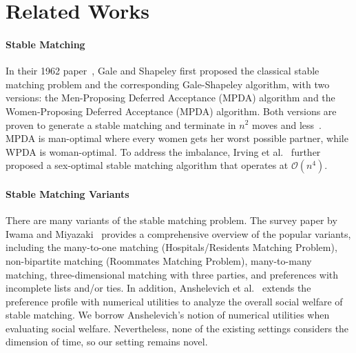 \section{Related Works}
\paragraph{Stable Matching}
In their 1962 paper~\cite{galeshapley1962}, Gale and Shapeley first proposed the classical stable matching problem and the corresponding
Gale-Shapeley algorithm, with two versions: the Men-Proposing Deferred Acceptance (MPDA) algorithm and the Women-Proposing Deferred Acceptance (MPDA) algorithm. Both versions are proven to generate a stable matching and terminate in $n^2$ moves and less~\cite{irving1989textbook}. MPDA is man-optimal where every women gets her worst possible partner, while WPDA is woman-optimal. To address the imbalance, Irving et al.~\cite{irving1987efficient} further proposed a sex-optimal stable matching algorithm that operates at $\mathcal{O}(n^4)$.

\paragraph{Stable Matching Variants}
There are many variants of the stable matching problem. The survey paper by Iwama and Miyazaki~\cite{iwama2008survey} provides a comprehensive overview of the popular variants, including the many-to-one matching (Hospitals/Residents Matching Problem), non-bipartite matching (Roommates Matching Problem), many-to-many matching, three-dimensional matching with three parties, and preferences with incomplete lists and/or ties. In addition, Anshelevich et al.~\cite{Anshelevich2013} extends the preference profile with numerical utilities to analyze the overall social welfare of stable matching. We borrow Anshelevich's notion of numerical utilities when evaluating social welfare. Nevertheless, none of the existing settings considers the dimension of time, so our setting remains novel.